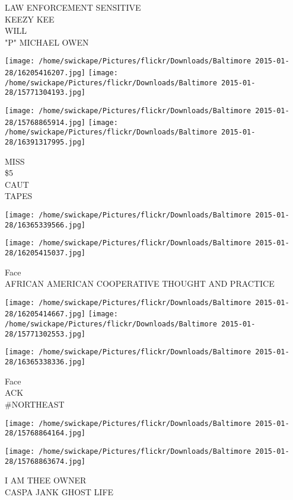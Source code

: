 \documentclass[10pt,letterpaper]{article}
\begin{document}
LAW ENFORCEMENT SENSITIVE\\
KEEZY KEE\\
WILL\\
"P" MICHAEL OWEN
\pagebreak

\texttt{[image: /home/swickape/Pictures/flickr/Downloads/Baltimore 2015-01-28/16205416207.jpg]}
\texttt{[image: /home/swickape/Pictures/flickr/Downloads/Baltimore 2015-01-28/15771304193.jpg]}

\texttt{[image: /home/swickape/Pictures/flickr/Downloads/Baltimore 2015-01-28/15768865914.jpg]}
\texttt{[image: /home/swickape/Pictures/flickr/Downloads/Baltimore 2015-01-28/16391317995.jpg]}

MISS\\
\$5\\
CAUT\\
TAPES
\pagebreak

\texttt{[image: /home/swickape/Pictures/flickr/Downloads/Baltimore 2015-01-28/16365339566.jpg]}

\vspace{0.25in}
\texttt{[image: /home/swickape/Pictures/flickr/Downloads/Baltimore 2015-01-28/16205415037.jpg]}

Face\\
AFRICAN AMERICAN COOPERATIVE THOUGHT AND PRACTICE
\pagebreak

\texttt{[image: /home/swickape/Pictures/flickr/Downloads/Baltimore 2015-01-28/16205414667.jpg]}
\texttt{[image: /home/swickape/Pictures/flickr/Downloads/Baltimore 2015-01-28/15771302553.jpg]}

\vspace{0.25in}
\texttt{[image: /home/swickape/Pictures/flickr/Downloads/Baltimore 2015-01-28/16365338336.jpg]}

Face\\
ACK\\
\#NORTHEAST
\pagebreak

\texttt{[image: /home/swickape/Pictures/flickr/Downloads/Baltimore 2015-01-28/15768864164.jpg]}

\vspace{0.25in}
\texttt{[image: /home/swickape/Pictures/flickr/Downloads/Baltimore 2015-01-28/15768863674.jpg]}

I AM THEE OWNER\\
CASPA JANK GHOST LIFE
\pagebreak
\end{document}
